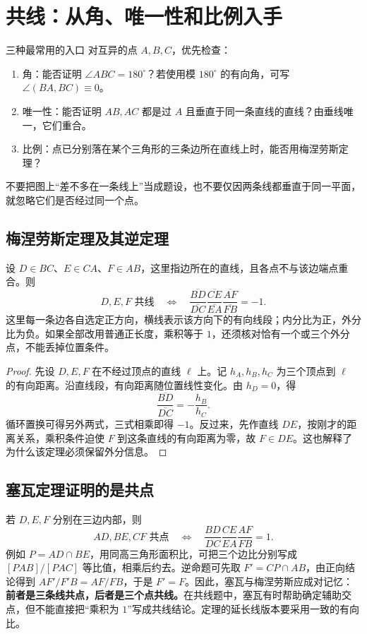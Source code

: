 \documentclass[lang=cn,12pt,fontset=none,a4paper,openany]{beautybook}
\begin{document}
\section{共线：从角、唯一性和比例入手}
\begin{keybox}{三种最常用的入口}
对互异的点 $A,B,C$，优先检查：
\begin{enumerate}
\item 角：能否证明 $\angle ABC=180^\circ$？若使用模 $180^\circ$ 的有向角，可写 $\angle(BA,BC)\equiv0$。
\item 唯一性：能否证明 $AB,AC$ 都是过 $A$ 且垂直于同一条直线的直线？由垂线唯一，它们重合。
\item 比例：点已分别落在某个三角形的三条边所在直线上时，能否用梅涅劳斯定理？
\end{enumerate}
不要把图上“差不多在一条线上”当成题设，也不要仅因两条线都垂直于同一平面，就忽略它们是否经过同一个点。
\end{keybox}

\subsection{梅涅劳斯定理及其逆定理}
设 $D\in BC$、$E\in CA$、$F\in AB$，这里指边所在的直线，且各点不与该边端点重合。则
\[
 D,E,F\text{ 共线}\quad\Longleftrightarrow\quad
 \frac{\overline{BD}}{\overline{DC}}
 \frac{\overline{CE}}{\overline{EA}}
 \frac{\overline{AF}}{\overline{FB}}=-1.
\]
这里每一条边各自选定正方向，横线表示该方向下的有向线段；内分比为正，外分比为负。如果全部改用普通正长度，乘积等于 $1$，还须核对恰有一个或三个外分点，不能丢掉位置条件。
\begin{proof}
先设 $D,E,F$ 在不经过顶点的直线 $\ell$ 上。记 $h_A,h_B,h_C$ 为三个顶点到 $\ell$ 的有向距离。沿直线段，有向距离随位置线性变化。由 $h_D=0$，得
\[
 \frac{\overline{BD}}{\overline{DC}}=-\frac{h_B}{h_C}.
\]
循环置换可得另外两式，三式相乘即得 $-1$。反过来，先作直线 $DE$，按刚才的距离关系，乘积条件迫使 $F$ 到这条直线的有向距离为零，故 $F\in DE$。这也解释了为什么该定理必须保留外分信息。
\end{proof}

\subsection{塞瓦定理证明的是共点}
若 $D,E,F$ 分别在三边内部，则
\[
 AD,BE,CF\text{ 共点}\quad\Longleftrightarrow\quad
 \frac{BD}{DC}\frac{CE}{EA}\frac{AF}{FB}=1.
\]
例如 $P=AD\cap BE$，用同高三角形面积比，可把三个边比分别写成 $[PAB]/[PAC]$ 等比值，相乘后约去。逆命题可先取 $F'=CP\cap AB$，由正向结论得到 $AF'/F'B=AF/FB$，于是 $F'=F$。因此，塞瓦与梅涅劳斯应成对记忆：\textbf{前者是三条线共点，后者是三个点共线。}在共线题中，塞瓦有时帮助确定辅助交点，但不能直接把“乘积为 $1$”写成共线结论。定理的延长线版本要采用一致的有向比。
\end{document}
